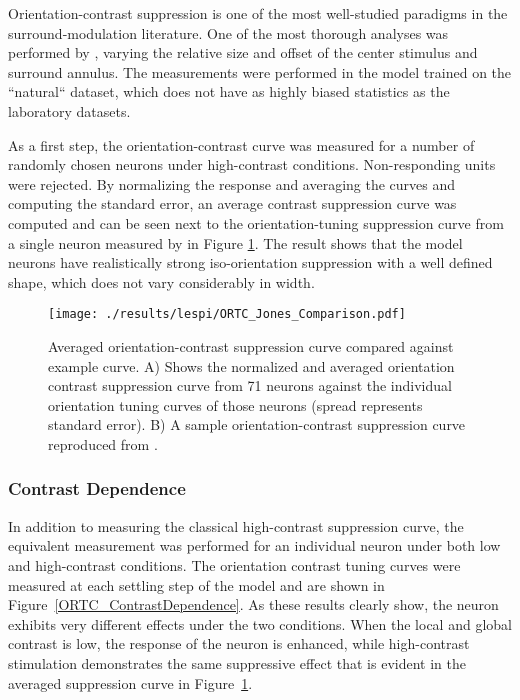 Orientation-contrast suppression is one of the most well-studied
paradigms in the surround-modulation literature. One of the most
thorough analyses was performed by \cite{Jones2002}, varying the
relative size and offset of the center stimulus and surround annulus.
The measurements were performed in the model trained on the
``natural`` dataset, which does not have as highly biased statistics
as the laboratory datasets.

As a first step, the orientation-contrast curve was measured for a
number of randomly chosen neurons under high-contrast conditions.
Non-responding units were rejected.
By normalizing the response
and averaging the curves and computing the standard error, an average
contrast suppression curve was computed and can be seen next to
the orientation-tuning suppression curve from a single neuron measured
by \cite{Jones2002} in Figure \ref{ORTC_Jones}. The result shows that the
model neurons have realistically strong iso-orientation suppression with a
well defined shape, which does not vary considerably in width.

\begin{figure}
	\centering
        \texttt{[image: ./results/lespi/ORTC\_Jones\_Comparison.pdf]}
	\caption[Averaged orientation-contrast suppression curve compared
      against \cite{Jones2002} example curve.]{Averaged
          orientation-contrast suppression curve compared against
          \cite{Jones2002} example curve. A) Shows the normalized and
      averaged orientation 
      contrast suppression curve from 71 neurons against the individual
      orientation tuning curves of those neurons (spread represents
      standard error). B) A sample orientation-contrast suppression
      curve reproduced from \cite{Jones2002}.}
	\label{ORTC_Jones}
\end{figure}

\subsubsection{Contrast Dependence}

In addition to measuring the classical high-contrast suppression
curve, the equivalent measurement was performed for an individual
neuron under both low and high-contrast conditions. The orientation
contrast tuning curves were measured at each settling step of the
model and are shown in Figure~\ref{ORTC_ContrastDependence}. As these
results clearly show, the neuron exhibits very different effects under
the two conditions. When the local and global contrast is low, the
response of the neuron is enhanced, while high-contrast stimulation
demonstrates the same suppressive effect that is evident in the
averaged suppression curve in Figure~\ref{ORTC_Jones}.

